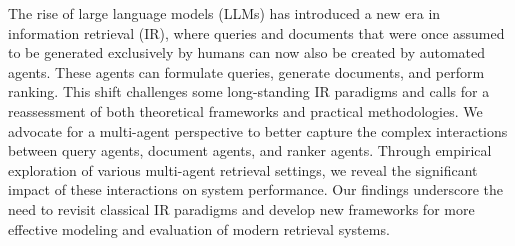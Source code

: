 The rise of large language models (LLMs) has introduced a new era in information retrieval (IR), where queries and documents that were once assumed to be generated exclusively by humans can now also be created by automated agents. These agents can formulate queries, generate documents, and perform ranking. This shift challenges some long-standing IR paradigms and calls for a reassessment of both theoretical frameworks and practical methodologies.
We advocate for a multi-agent perspective to better capture the complex interactions between query agents, document agents, and ranker agents. 
Through empirical exploration of various multi-agent retrieval settings, we reveal the significant impact of these interactions on system performance.
Our findings underscore the need to revisit classical IR paradigms and develop new frameworks for more effective modeling and evaluation of modern retrieval systems.